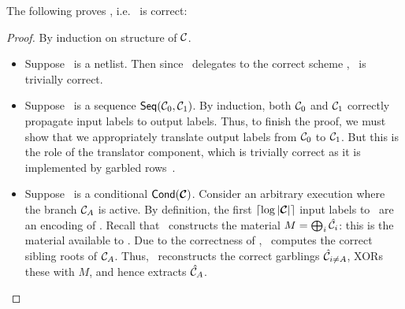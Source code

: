 The following proves , i.e. \ourschemelong\
is correct:
\begin{proof}
  By induction on structure of $\mathcal C$.
  \begin{itemize}
    \item Suppose \cir\ is a netlist. Then since \ourschemelong\ delegates
      to the correct scheme \underscheme, \ourschemelong\ is trivially
      correct.
    \item Suppose \cir\ is a sequence $\textsf{Seq}(\mathcal C_0, \mathcal C_1)$.
      By induction, both $\mathcal C_0$ and $\mathcal C_1$ correctly propagate
      input labels to output labels.
      Thus, to finish the proof, we must show that we appropriately
      translate output labels from $\mathcal C_0$ to $\mathcal C_1$. But this is
      the role of the translator component, which is trivially correct
      as it is implemented by garbled rows~\HK.
    \item Suppose \cir\ is a conditional $\conditional(\vec \cir)$.
      Consider an arbitrary execution where the branch $\mathcal C_{A}$ is
      active.
      By definition, the first $\lceil \log |\vec \cir| \rceil$ input
      labels to \gEv\ are an encoding of \act.
      Recall that \gGb\ constructs the material $M = \bigoplus_i
      \hat{\mathcal C}_i$: this is the material available to \gEv.
      Due to the correctness of \gadget, \gEv\ computes the correct
      sibling roots of $\mathcal C_A$. Thus, \evcond\ reconstructs the correct
      garblings $\hat{\mathcal C}_{i \neq A}$, XORs these with $M$, and hence
      extracts $\hat{\mathcal C}_A$.


\end{itemize}
\end{proof}
